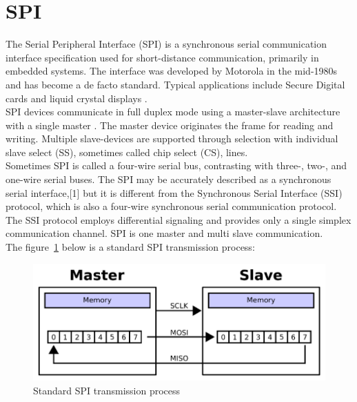 \section{SPI}
\label{sec:SPI}
The Serial Peripheral Interface (SPI) is a synchronous serial communication interface specification used for short-distance communication, primarily in embedded systems. The interface was developed by Motorola in the mid-1980s and has become a de facto standard. Typical applications include Secure Digital cards and liquid crystal displays \cite{yadlapati2018constrained}.
\\
SPI devices communicate in full duplex mode using a master-slave architecture with a single master \cite{szekacs2007realising}. The master device originates the frame for reading and writing. Multiple slave-devices are supported through selection with individual slave select (SS), sometimes called chip select (CS), lines.
\\
Sometimes SPI is called a four-wire serial bus, contrasting with three-, two-, and one-wire serial buses. The SPI may be accurately described as a synchronous serial interface,[1] but it is different from the Synchronous Serial Interface (SSI) protocol, which is also a four-wire synchronous serial communication protocol. The SSI protocol employs differential signaling and provides only a single simplex communication channel. SPI is one master and multi slave communication.
\\
The figure~\ref{fig:2.12}  below is a standard SPI transmission process:
\begin{figure}[!ht]
	\centering
	\includegraphics[width=15cm]{grafiken/2.12.pdf}
	\caption{Standard SPI transmission process} 
	\label{fig:2.12}
\end{figure}
\FloatBarrier

